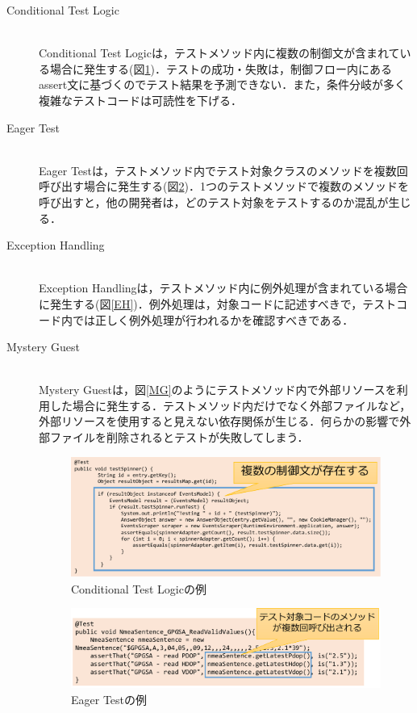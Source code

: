 \documentclass[12pt]{jarticle} %
\begin{document}
\begin{description}
\newpage
\item[Conditional Test Logic]~\\
Conditional Test Logicは，テストメソッド内に複数の制御文が含まれている場合に発生する(図\ref{CTL})．テストの成功・失敗は，制御フロー内にあるassert文に基づくのでテスト結果を予測できない．また，条件分岐が多く複雑なテストコードは可読性を下げる．



\item[Eager Test]~\\
Eager Testは，テストメソッド内でテスト対象クラスのメソッドを複数回呼び出す場合に発生する(図\ref{ET})．1つのテストメソッドで複数のメソッドを呼び出すと，他の開発者は，どのテスト対象をテストするのか混乱が生じる．


\item[Exception Handling]~\\
Exception Handlingは，テストメソッド内に例外処理が含まれている場合に発生する(図\ref{EH})．例外処理は，対象コードに記述すべきで，テストコード内では正しく例外処理が行われるかを確認すべきである．

\item[Mystery Guest]~\\
Mystery Guestは，図\ref{MG}のようにテストメソッド内で外部リソースを利用した場合に発生する．テストメソッド内だけでなく外部ファイルなど，外部リソースを使用すると見えない依存関係が生じる．何らかの影響で外部ファイルを削除されるとテストが失敗してしまう．

\begin{figure}[htbp]
\begin{center}
\includegraphics[clip,width=15cm]{image/CTL.pdf}
\caption{Conditional Test Logicの例}
\label{CTL}
\end{center}
\end{figure}

\begin{figure}[htbp]
\begin{center}
\includegraphics[clip,width=15cm]{image/ET.pdf}
\caption{Eager Testの例}
\label{ET}
\end{center}
\end{figure}


\end{description}
\end{document}
